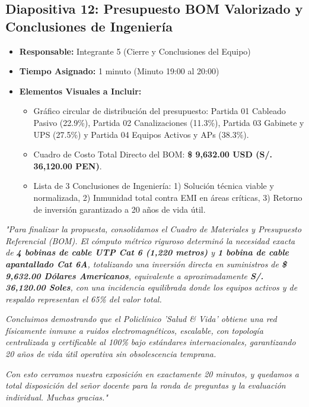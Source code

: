 \documentclass[11pt,a4paper]{article}
\begin{document}
\vspace{0.5cm}

\subsection{Diapositiva 12: Presupuesto BOM Valorizado y Conclusiones de Ingeniería}
\begin{itemize}[leftmargin=*]
    \item \textbf{Responsable:} Integrante 5 (Cierre y Conclusiones del Equipo)
    \item \textbf{Tiempo Asignado:} 1 minuto (Minuto 19:00 al 20:00)
    \item \textbf{Elementos Visuales a Incluir:}
    \begin{itemize}
        \item Gráfico circular de distribución del presupuesto: Partida 01 Cableado Pasivo (22.9\%), Partida 02 Canalizaciones (11.3\%), Partida 03 Gabinete y UPS (27.5\%) y Partida 04 Equipos Activos y APs (38.3\%).
        \item Cuadro de Costo Total Directo del BOM: \textbf{\$ 9,632.00 USD (S/. 36,120.00 PEN)}.
        \item Lista de 3 Conclusiones de Ingeniería: 1) Solución técnica viable y normalizada, 2) Inmunidad total contra EMI en áreas críticas, 3) Retorno de inversión garantizado a 20 años de vida útil.
    \end{itemize}
\end{itemize}

\begin{tcolorbox}[colback=white,colframe=primaryblue,title=\textbf{Speech Verbal del Integrante 5 (Guion Palabra por Palabra)}]
\textit{"Para finalizar la propuesta, consolidamos el Cuadro de Materiales y Presupuesto Referencial (BOM). El cómputo métrico riguroso determinó la necesidad exacta de \textbf{4 bobinas de cable UTP Cat 6 (1,220 metros)} y \textbf{1 bobina de cable apantallado Cat 6A}, totalizando una inversión directa en suministros de \textbf{\$ 9,632.00 Dólares Americanos}, equivalente a aproximadamente \textbf{S/. 36,120.00 Soles}, con una incidencia equilibrada donde los equipos activos y de respaldo representan el 65\% del valor total.}\par\vspace{2mm}
\textit{Concluimos demostrando que el Policlínico 'Salud \& Vida' obtiene una red físicamente inmune a ruidos electromagnéticos, escalable, con topología centralizada y certificable al 100\% bajo estándares internacionales, garantizando 20 años de vida útil operativa sin obsolescencia temprana.}\par\vspace{2mm}
\textit{Con esto cerramos nuestra exposición en exactamente 20 minutos, y quedamos a total disposición del señor docente para la ronda de preguntas y la evaluación individual. Muchas gracias."}
\end{tcolorbox}
\end{document}
